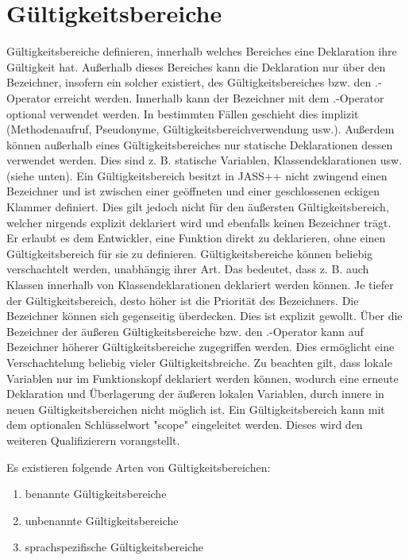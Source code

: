 \chapter{Gültigkeitsbereiche}
Gültigkeitsbereiche definieren, innerhalb welches Bereiches eine Deklaration ihre Gültigkeit hat. Außerhalb dieses Bereiches
kann die Deklaration nur über den Bezeichner, insofern ein solcher existiert, des Gültigkeitsbereiches bzw. den .-Operator erreicht werden.
Innerhalb kann der Bezeichner mit dem .-Operator optional verwendet werden.
In bestimmten Fällen geschieht dies implizit (Methodenaufruf, Pseudonyme, Gültigkeitsbereichverwendung usw.).
Außerdem können außerhalb eines Gültigkeitsbereiches nur statische Deklarationen dessen verwendet werden.
Dies sind z. B. statische Variablen, Klassendeklarationen usw. (siehe unten).
Ein Gültigkeitsbereich besitzt in JASS++ nicht zwingend einen Bezeichner und ist zwischen einer geöffneten und einer geschlossenen eckigen
Klammer definiert.
Dies gilt jedoch nicht für den äußersten Gültigkeitsbereich, welcher nirgends explizit deklariert wird und ebenfalls keinen Bezeichner trägt.
Er erlaubt es dem Entwickler, eine Funktion direkt zu deklarieren, ohne einen Gültigkeitsbereich für sie zu definieren.
Gültigkeitsbereiche können beliebig verschachtelt werden, unabhängig ihrer Art. Das bedeutet, dass z. B. auch Klassen innerhalb von 
Klassendeklarationen deklariert werden können.
Je tiefer der Gültigkeitsbereich, desto höher ist die Priorität des Bezeichners. Die Bezeichner können sich gegenseitig überdecken.
Dies ist explizit gewollt. Über die Bezeichner der äußeren Gültigkeitsbereiche bzw. den .-Operator kann auf Bezeichner höherer
Gültigkeitsbereiche zugegriffen werden. Dies ermöglicht eine Verschachtelung beliebig vieler Gültigkeitsbreiche.
Zu beachten gilt, dass lokale Variablen nur im Funktionskopf deklariert werden können, wodurch eine erneute Deklaration und Überlagerung
der äußeren lokalen Variablen, durch innere in neuen Gültigkeitsbereichen nicht möglich ist.
Ein Gültigkeitsbereich kann mit dem optionalen Schlüsselwort "scope" eingeleitet werden. Dieses wird den weiteren Qualifizierern vorangstellt. 

Es existieren folgende Arten von Gültigkeitsbereichen:
\begin{enumerate}
\item benannte Gültigkeitsbereiche
\item unbenannte Gültigkeitsbereiche
\item sprachspezifische Gültigkeitsbereiche
\end{enumerate}

